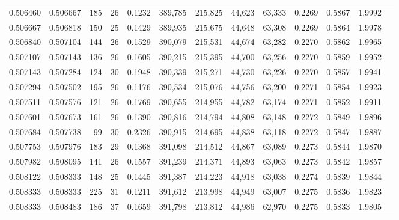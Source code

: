 \begin{tabular}{rrrrrrrrrrrrr}
0.506460 & 0.506667 &    185 &    26 &                                     0.1232 & 389,785 & 215,825 &  44,623 &  63,333 & 0.2269 & 0.5867 & 1.9992 \\
0.506667 & 0.506818 &    150 &    25 &                                     0.1429 & 389,935 & 215,675 &  44,648 &  63,308 & 0.2269 & 0.5864 & 1.9978 \\
0.506840 & 0.507104 &    144 &    26 &                                     0.1529 & 390,079 & 215,531 &  44,674 &  63,282 & 0.2270 & 0.5862 & 1.9965 \\
0.507107 & 0.507143 &    136 &    26 &                                     0.1605 & 390,215 & 215,395 &  44,700 &  63,256 & 0.2270 & 0.5859 & 1.9952 \\
0.507143 & 0.507284 &    124 &    30 &                                     0.1948 & 390,339 & 215,271 &  44,730 &  63,226 & 0.2270 & 0.5857 & 1.9941 \\
0.507294 & 0.507502 &    195 &    26 &                                     0.1176 & 390,534 & 215,076 &  44,756 &  63,200 & 0.2271 & 0.5854 & 1.9923 \\
0.507511 & 0.507576 &    121 &    26 &                                     0.1769 & 390,655 & 214,955 &  44,782 &  63,174 & 0.2271 & 0.5852 & 1.9911 \\
0.507601 & 0.507673 &    161 &    26 &                                     0.1390 & 390,816 & 214,794 &  44,808 &  63,148 & 0.2272 & 0.5849 & 1.9896 \\
0.507684 & 0.507738 &     99 &    30 &                                     0.2326 & 390,915 & 214,695 &  44,838 &  63,118 & 0.2272 & 0.5847 & 1.9887 \\
0.507753 & 0.507976 &    183 &    29 &                                     0.1368 & 391,098 & 214,512 &  44,867 &  63,089 & 0.2273 & 0.5844 & 1.9870 \\
0.507982 & 0.508095 &    141 &    26 &                                     0.1557 & 391,239 & 214,371 &  44,893 &  63,063 & 0.2273 & 0.5842 & 1.9857 \\
0.508122 & 0.508333 &    148 &    25 &                                     0.1445 & 391,387 & 214,223 &  44,918 &  63,038 & 0.2274 & 0.5839 & 1.9844 \\
0.508333 & 0.508333 &    225 &    31 &                                     0.1211 & 391,612 & 213,998 &  44,949 &  63,007 & 0.2275 & 0.5836 & 1.9823 \\
0.508333 & 0.508483 &    186 &    37 &                                     0.1659 & 391,798 & 213,812 &  44,986 &  62,970 & 0.2275 & 0.5833 & 1.9805 \\

\end{tabular}
